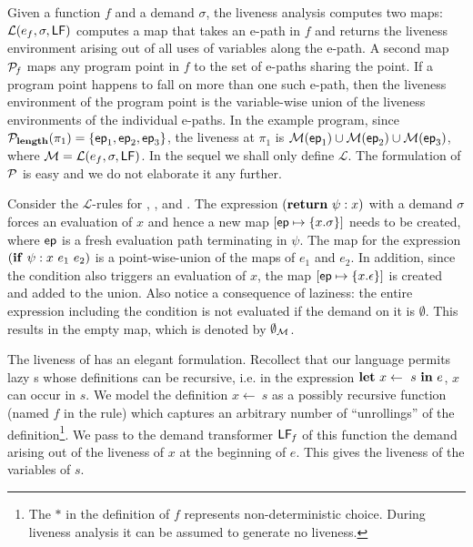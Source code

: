 \documentclass[9pt]{sigplanconf}
\begin{document}
Given  a function  $\mathit{f}$ and  a demand  $\sigma$,  the liveness
analysis  computes  two   maps:  $\mathcal{L}(e_f,  \sigma,  \mathsf{LF})$
computes a  map that takes an  e-path in ${\mathit f}$  and returns the
liveness environment  arising out of  all uses of variables  along the
e-path.  A second map $\cal{P}_{\mathit  f}$ maps any program point in
$\mathit f$  to the set  of e-paths sharing  the point.  If  a program
point happens to fall on more  than one such e-path, then the liveness
environment of  the program  point is the  variable-wise union  of the
liveness  environments  of the  individual  e-paths.   In the  example
program,  since ${\mathcal P}_{\mathbf{length}}(\pi_1)  = \lbrace  \mathsf{ep}_1, \mathsf{ep}_2,
\mathsf{ep}_3\rbrace$, the  liveness at $\pi_1$  is ${\cal M}(\mathsf{ep}_1)  \cup {\cal
  M}(\mathsf{ep}_2) \cup  {\cal M}(\mathsf{ep}_3)$,  where ${\cal M}  = \mathcal{L}(e_f,
\sigma, \mathsf{LF})$.  In the  sequel we shall only define $\mathcal{L}$.
The formulation  of $\cal{P}$ is easy  and we do not  elaborate it any
further.

Consider the  $\mathcal{L}$-rules for {\LET}, {\SIF},  and {\SRETURN}.
The expression  $(\mbox{$\mathbf{ return}$}~\psi:x)$ with  a demand $\sigma$  forces an
evaluation  of  $x$ and  hence  a  new map  $[\mathit{\mathsf{ep}}  \mapsto
  \{x.\sigma\}]  $ needs  to be  created,  where $\mathsf{ep}$  is a  fresh
evaluation path  terminating in  $\psi$.  The  map for  the expression
$(\mbox{$\mathbf{ if}$}~\psi:x~e_1~e_2)$ is a point-wise-union of the maps of $e_1$ and
$e_2$. In addition, since the condition also triggers an evaluation of
$x$, the map $[\mathit{\mathsf{ep}} \mapsto \{x.\epsilon\}]$ is created and
added  to the  union.   Also notice  a  consequence of  laziness: the
entire  expression including  the condition  is not  evaluated if  the
demand on it is $\emptyset$.  This  results in the empty map, which is
denoted by $\emptyset_{\cal{M}}$.



 The liveness  of {\LET} has  an elegant formulation.   Recollect that
 our language permits lazy {\LET}s whose definitions can be recursive,
 i.e.  in the expression $\mbox{$\mathbf{ let}$}~x \leftarrow~s~\mbox{$\mathbf{ in}$}~e$, $x$ can occur in
 $s$.   We  model  the  definition  $x  \leftarrow~s$  as  a  possibly
 recursive function (named $\mathit{f}$ in the rule) which captures an
 arbitrary number of ``unrollings'' of the definition\footnote{The $*$
   in  the definition  of ${\mathit  f}$ represents  non-deterministic
   choice.  During liveness analysis it  can be assumed to generate no
   liveness.}.  We  pass to  the demand  transformer $\mathsf{LF}_{\mathit
   f}$ of this function the demand  arising out of the liveness of $x$
 at the beginning of $e$. This  gives the liveness of the variables of
 $s$.
\end{document}
